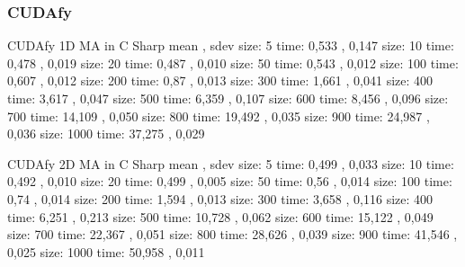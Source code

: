 \subsubsection{CUDAfy}
CUDAfy 1D MA in C Sharp  mean  , sdev \newline
size: 5 time: 0,533 , 0,147 \newline
size: 10 time: 0,478 , 0,019 \newline
size: 20 time: 0,487 , 0,010 \newline
size: 50 time: 0,543 , 0,012 \newline
size: 100 time: 0,607 , 0,012 \newline
size: 200 time: 0,87 , 0,013 \newline
size: 300 time: 1,661 , 0,041 \newline
size: 400 time: 3,617 , 0,047 \newline
size: 500 time: 6,359 , 0,107 \newline
size: 600 time: 8,456 , 0,096 \newline
size: 700 time: 14,109 , 0,050 \newline
size: 800 time: 19,492 , 0,035 \newline
size: 900 time: 24,987 , 0,036 \newline
size: 1000 time: 37,275 , 0,029 \newline

CUDAfy 2D MA in C Sharp  mean  , sdev \newline
size: 5 time: 0,499 , 0,033 \newline
size: 10 time: 0,492 , 0,010 \newline
size: 20 time: 0,499 , 0,005 \newline
size: 50 time: 0,56 , 0,014 \newline
size: 100 time: 0,74 , 0,014 \newline
size: 200 time: 1,594 , 0,013 \newline
size: 300 time: 3,658 , 0,116 \newline
size: 400 time: 6,251 , 0,213 \newline
size: 500 time: 10,728 , 0,062 \newline
size: 600 time: 15,122 , 0,049 \newline
size: 700 time: 22,367 , 0,051 \newline
size: 800 time: 28,626 , 0,039 \newline
size: 900 time: 41,546 , 0,025 \newline
size: 1000 time: 50,958 , 0,011 \newline
